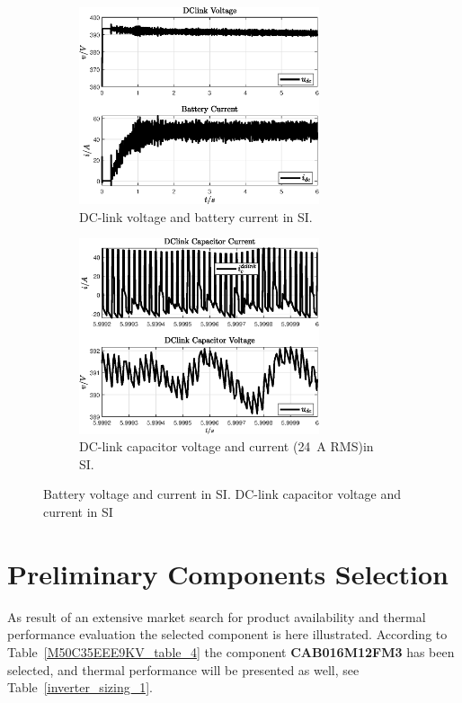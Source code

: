 \documentclass[11pt,a4paper,oneside]{book}
\numberwithin{equation}{section}
\theoremstyle{it}
\theoremstyle{definition}
\begin{document}
\begin{figure}[H]
	\centering
	\begin{subfigure}{0.5\textwidth}
		\centering
		\includegraphics[width = 200pt, angle = 0, 
		keepaspectratio]{figures/preliminary_simulation_results/sim_results_preliminary_fig_5.eps}
		\captionsetup{width=0.65\textwidth, font=footnotesize}	
		\caption{DC-link voltage and battery current in SI.}
		\label{psim_results_fig_5}
	\end{subfigure}%
	\begin{subfigure}{.5\textwidth}
		\centering
		\includegraphics[width = 200pt, angle = 0, 
		keepaspectratio]{figures/preliminary_simulation_results/sim_results_preliminary_fig_6.eps}
		\captionsetup{width=0.65\textwidth, font=footnotesize}	
		\caption{DC-link capacitor voltage and current (\SI{24}{\ampere} RMS)in SI.}
		\label{psim_results_fig_6}
	\end{subfigure}
	\captionsetup{width=0.5\textwidth, font=small}	
	\caption{Battery voltage and current in SI. DC-link capacitor voltage and current in SI}
	\label{psim_results_fig_56}
\end{figure}

\section{Preliminary Components Selection}
As result of an extensive market search for product availability and thermal performance evaluation the selected  component is here illustrated. According to Table~\ref{M50C35EEE9KV_table_4} the component \textbf{CAB016M12FM3} has been selected, and thermal performance will be presented as well, see Table~\ref{inverter_sizing_1}.
\end{document}
